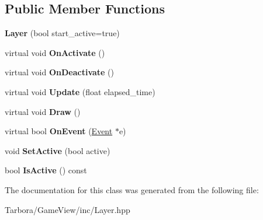 \subsection*{Public Member Functions}
\begin{DoxyCompactItemize}
\item 
\mbox{\label{classTarbora_1_1Layer_ac718548de706f1cea072eaecda09f537}} 
{\bfseries Layer} (bool start\+\_\+active=true)
\item 
\mbox{\label{classTarbora_1_1Layer_a7ae1fe1313d53004e2de8b2f02dd074f}} 
virtual void {\bfseries On\+Activate} ()
\item 
\mbox{\label{classTarbora_1_1Layer_a5e0a67e64b23696527b93c5b388f3f0a}} 
virtual void {\bfseries On\+Deactivate} ()
\item 
\mbox{\label{classTarbora_1_1Layer_af0819c61bf5b4a1746dfa93f0d819e1a}} 
virtual void {\bfseries Update} (float elapsed\+\_\+time)
\item 
\mbox{\label{classTarbora_1_1Layer_a77874dc29e6cfccff041460e05d0c892}} 
virtual void {\bfseries Draw} ()
\item 
\mbox{\label{classTarbora_1_1Layer_ab15054afd1183dae0cc7e235d05e7dbb}} 
virtual bool {\bfseries On\+Event} (\hyperlink{structTarbora_1_1Event}{Event} $\ast$e)
\item 
\mbox{\label{classTarbora_1_1Layer_a9451fd1d4d3929c11a02e5d11c425d8d}} 
void {\bfseries Set\+Active} (bool active)
\item 
\mbox{\label{classTarbora_1_1Layer_a48f220755f55d79401212d9e857a8ecb}} 
bool {\bfseries Is\+Active} () const
\end{DoxyCompactItemize}


The documentation for this class was generated from the following file\+:\begin{DoxyCompactItemize}
\item 
Tarbora/\+Game\+View/inc/Layer.\+hpp\end{DoxyCompactItemize}

